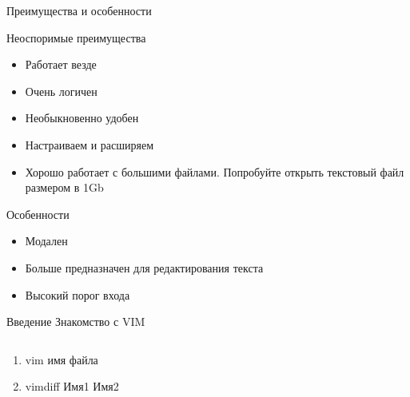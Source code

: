 \documentclass{beamer}
\begin{document}
\begin{frame}{Преимущества и особенности}
	\begin{block}{Неоспоримые преимущества}
	\begin{itemize}
		\item{Работает везде}
		\item{Очень логичен}
		\item{Необыкновенно удобен}
		\item{Настраиваем и расширяем}
		\item{Хорошо работает с большими файлами. Попробуйте открыть текстовый файл размером в 1Gb}
	\end{itemize}
	\end{block}
	\begin{block}{Особенности}
	\begin{itemize}
		\item{Модален}
		\item{Больше предназначен для \alert{редактирования} текста}
		\item{Высокий порог входа}
	\end{itemize}
	\end{block}

\end{frame}

\begin{frame}{Введение}
	Знакомство с VIM

	\begin{columns}[c]

	\begin{column}{.4\textwidth}
	\begin{enumerate}
		\item
				vim имя файла
		\item vimdiff Имя1 Имя2
	\end{enumerate}%
	\end{column}

	\begin{column}{.6\textwidth}
	\end{column}

	\end{columns}
\end{frame}
\end{document}
